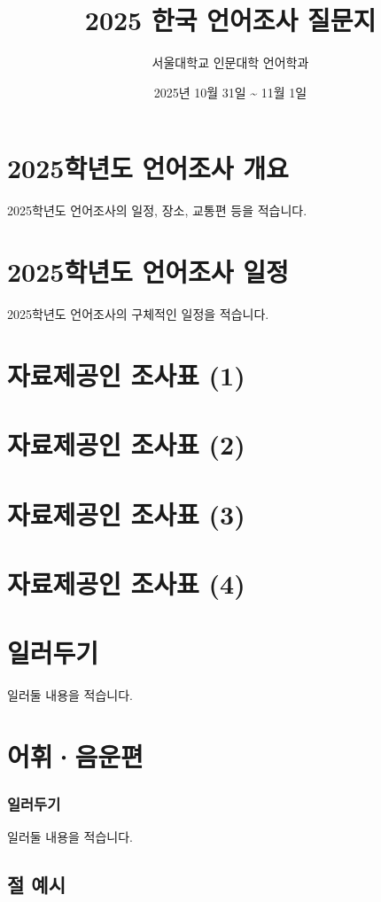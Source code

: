 \documentclass{snu-fl-questionnaire}
\title{2025 한국 언어조사 질문지}
\author{서울대학교 인문대학 언어학과}
\date{2025년 10월 31일 \textasciitilde{} 11월 1일}
\begin{document}
\frontmatter
\maketitle
\tableofcontents

\chapter{2025학년도 언어조사 개요}
2025학년도 언어조사의 일정, 장소, 교통편 등을 적습니다.

\chapter{2025학년도 언어조사 일정}
2025학년도 언어조사의 구체적인 일정을 적습니다.

\chapter{자료제공인 조사표 (1)}
\Consultant

\chapter{자료제공인 조사표 (2)}
\Consultant

\chapter{자료제공인 조사표 (3)}
\Consultant

\chapter{자료제공인 조사표 (4)}
\Consultant

\chapter{일러두기}
일러둘 내용을 적습니다.


\mainmatter
\chapter{어휘·음운편}
\subsection{일러두기}
일러둘 내용을 적습니다.

\section{절 예시}
\end{document}
